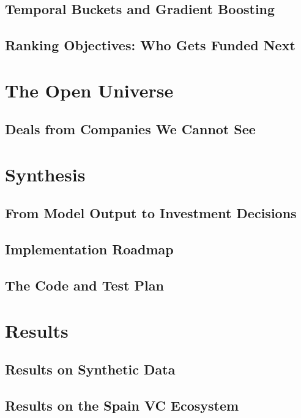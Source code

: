 \documentclass[11pt,a4paper,twoside,openany]{book}
\theoremstyle{plain}
\theoremstyle{definition}
\theoremstyle{remark}
\begin{document}
\chapter{Temporal Buckets and Gradient Boosting}\label{ch:buckets}


\chapter{Ranking Objectives: Who Gets Funded Next}\label{ch:ranking}


\part{The Open Universe}
\chapter{Deals from Companies We Cannot See}\label{ch:universe}


\part{Synthesis}
\chapter{From Model Output to Investment Decisions}\label{ch:decision}


\chapter{Implementation Roadmap}\label{ch:roadmap}


\chapter{The Code and Test Plan}\label{ch:codeplan}


\part{Results}
\chapter{Results on Synthetic Data}\label{ch:results-synth}


\chapter{Results on the Spain VC Ecosystem}\label{ch:results-spain}

\end{document}
